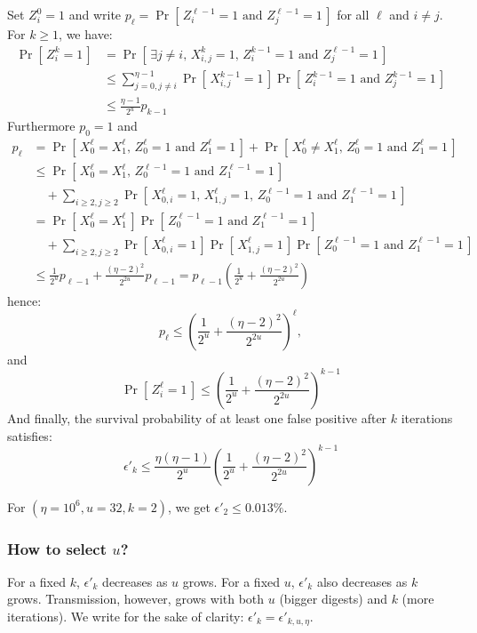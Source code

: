 \documentclass[11pt]{llncs}
\newcommand{\Prob}[1]{{\Pr\left[\,{#1}\,\right]}}
\begin{document}
Set $Z^0_i = 1$ and write $p_\ell = \Prob{Z^{\ell-1}_{i} = 1 \text{ and } Z^{\ell-1}_{j} = 1} $ for all $\ell$ and $i \neq j$.
For $k \ge 1$, we have:
\begin{align*}
\Prob{Z^k_i=1} &= \Prob{\exists j\neq i \text{, } X^k_{i,j} = 1 \text{, } Z^{k-1}_{i} = 1  \text{ and } Z^{\ell-1}_{j} = 1}  \\
&\le \sum_{j=0, j\neq i}^{\eta-1} \Prob{X^{k-1}_{i,j} = 1} \Prob{Z^{k-1}_{i} = 1 \text{ and } Z^{k-1}_{j} = 1}  \\
&\le \frac{\eta-1}{2^u} p_{k-1}
\end{align*}
Furthermore $p_0 = 1$ and
\begin{align*}
p_\ell &= \Prob{X^{\ell}_0 = X^{\ell}_1 \text{, } Z^{\ell}_{0} = 1 \text{ and } Z^{\ell}_{1} = 1}
  + \Prob{X^{\ell}_0 \neq X^{\ell}_1 \text{, } Z^{\ell}_{0} = 1 \text{ and } Z^{\ell}_{1} = 1} \\
&\le \Prob{X^{\ell}_0 = X^{\ell}_1 \text{, } Z^{\ell-1}_{0} = 1 \text{ and } Z^{\ell-1}_{1} = 1} \\
  &\quad+ \sum_{i \ge 2, j \ge 2} \Prob{X^\ell_{0,i} = 1 \text{, } X^\ell_{1,j} = 1 \text{, } Z^{\ell-1}_{0} = 1 \text{ and } Z^{\ell-1}_{1} = 1} \\
&= \Prob{X^{\ell}_0 = X^{\ell}_1} \Prob{Z^{\ell-1}_{0} = 1 \text{ and } Z^{\ell-1}_{1} = 1} \\
  &\quad+ \sum_{i \ge 2, j \ge 2} \Prob{X^\ell_{0,i} = 1} \Prob{X^\ell_{1,j} = 1} \Prob{Z^{\ell-1}_{0} = 1 \text{ and } Z^{\ell-1}_{1} = 1} \\
&\le \frac{1}{2^u} p_{\ell-1} + \frac{(\eta-2)^2}{2^{2u}} p_{\ell-1} = p_{\ell-1}\left(\frac{1}{2^u}  + \frac{(\eta-2)^2}{2^{2u}}\right)
\end{align*}
hence:
\[ p_\ell \le \left( \frac{1}{2^u} + \frac{(\eta-2)^2}{2^{2u}} \right)^\ell, \]
and
\[ \Prob{Z^\ell_i=1} \le \left( \frac{1}{2^u} + \frac{(\eta-2)^2}{2^{2u}} \right)^{k-1} \]
And finally, the survival probability of at least one false positive after $k$ iterations satisfies:
\[
\epsilon'_k \le \frac{\eta(\eta-1)}{2^u} \left( \frac{1}{2^u} + \frac{(\eta-2)^2}{2^{2u}} \right)^{k-1}
\]

For $(\eta=10^6,u=32,k=2)$, we get $\epsilon'_2 \le 0.013\%$.\smallskip

\subsubsection{How to select $u$?}
% 
For a fixed $k$, $\epsilon'_k$ decreases as $u$ grows. For a fixed $u$, $\epsilon'_k$ also decreases as $k$ grows. Transmission, however, grows with both $u$ (bigger digests) and $k$ (more iterations). We write for the sake of clarity: $\epsilon'_k = \epsilon'_{k,u,\eta}$.\smallskip
\end{document}
